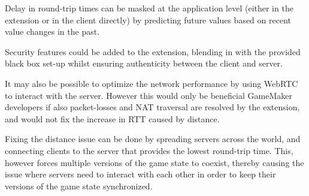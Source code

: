 \documentclass[bsc, 12pt, twoside, singlespacing, parskip, abbrevs, notimes, normalheadings, logo]{styles/infthesis}
\begin{document}
Delay in round-trip times can be masked at the application level (either in the extension or in the client directly) by predicting future values based on recent value changes in the past.

Security features could be added to the extension, blending in with the provided black box set-up whilst ensuring authenticity between the client and server.

It may also be possible to optimize the network performance by using WebRTC to interact with the server. However this would only be beneficial GameMaker developers if also packet-losses and NAT traversal are resolved by the extension, and would not fix the increase in RTT caused by distance.

Fixing the distance issue can be done by spreading servers across the world, and connecting clients to the server that provides the lowest round-trip time. This, however forces multiple versions of the game state to coexist, thereby causing the issue where servers need to interact with each other in order to keep their versions of the game state synchronized.







\end{document}
